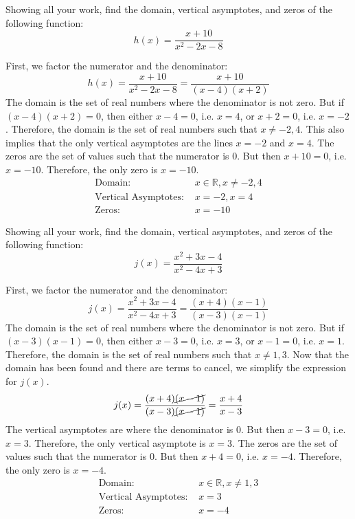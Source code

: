 \documentclass[11pt,letterpaper]{article}
\begin{document}
\newpage





 Showing all your work, find the domain, vertical asymptotes, and zeros of the following function:
	\[
	h(x)= \dfrac{x + 10}{x^2 - 2x - 8}
	\] \pspace

\sol First, we factor the numerator and the denominator:
	\[
	h(x)= \dfrac{x + 10}{x^2 - 2x - 8}= \dfrac{x + 10}{(x - 4)(x + 2)}
	\]
The domain is the set of real numbers where the denominator is not zero. But if $(x - 4)(x + 2)= 0$, then either $x - 4= 0$, i.e. $x= 4$, or $x + 2= 0$, i.e. $x= -2$. Therefore, the domain is the set of real numbers such that $x \neq -2, 4$. This also implies that the only vertical asymptotes are the lines $x= -2$ and $x= 4$. The zeros are the set of values such that the numerator is 0. But then $x + 10= 0$, i.e. $x= -10$. Therefore, the only zero is $x= -10$.  
	\[
	\boxed{
	\begin{aligned}
	\text{Domain: }& x \in \mathbb{R}, x \neq -2, 4 \\
	\text{Vertical Asymptotes: }& x= -2, x= 4 \\
	\text{Zeros: }& x= -10
	\end{aligned}
	}
	\]





\newpage





 Showing all your work, find the domain, vertical asymptotes, and zeros of the following function:
	\[
	j(x)= \dfrac{x^2 + 3x - 4}{x^2 - 4x + 3}
	\] \pspace

\sol First, we factor the numerator and the denominator:
	\[
	j(x)= \dfrac{x^2 + 3x - 4}{x^2 - 4x + 3}= \dfrac{(x + 4)(x - 1)}{(x - 3)(x - 1)}
	\]
The domain is the set of real numbers where the denominator is not zero. But if $(x - 3)(x - 1)= 0$, then either $x - 3= 0$, i.e. $x= 3$, or $x - 1= 0$, i.e. $x= 1$. Therefore, the domain is the set of real numbers such that $x \neq 1, 3$. Now that the domain has been found and there are terms to cancel, we simplify the expression for $j(x)$. 
	\[
	j(x)= \dfrac{(x + 4)\cancel{(x - 1)}}{(x - 3)\cancel{(x - 1)}}= \dfrac{x + 4}{x - 3}
	\]
The vertical asymptotes are where the denominator is 0. But then $x - 3= 0$, i.e. $x= 3$. Therefore, the only vertical asymptote is $x= 3$. The zeros are the set of values such that the numerator is 0. But then $x + 4= 0$, i.e. $x= -4$. Therefore, the only zero is $x= -4$.  
	\[
	\boxed{
	\begin{aligned}
	\text{Domain: }& x \in \mathbb{R}, x \neq 1, 3 \\
	\text{Vertical Asymptotes: }& x= 3 \\
	\text{Zeros: }& x= -4
	\end{aligned}
	}
	\]


\end{document}
